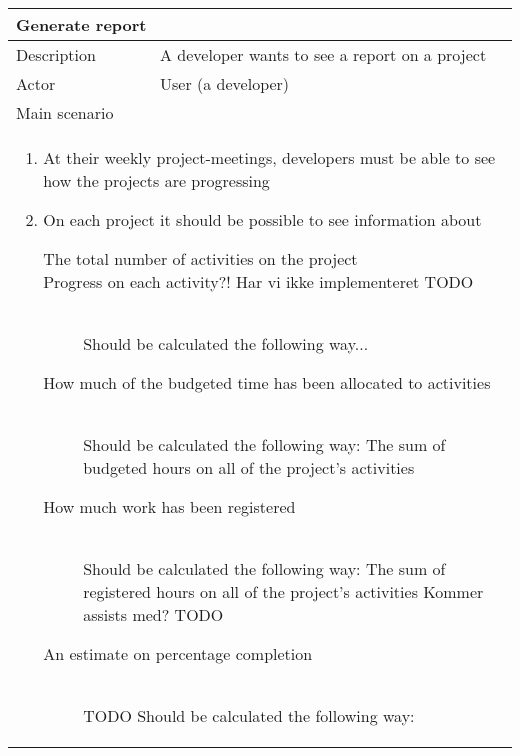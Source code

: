 \begin{table}[H]
  \begin{tabular}{|l|l|}
    \multicolumn{2}{l}{
      \bf{Generate report}
    }
    \\ \hline
    Description & A developer wants to see a report on a project
    \\ \hline
    Actor & User (a developer)
    \\ \hline \multicolumn{2}{|l|}{
      Main scenario 
    }
    \\ \hline \multicolumn{2}{|l|}{ \parbox{\textwidth}{
        \begin{enumerate}        
        \item{At their weekly project-meetings, developers must be able to see how the projects are progressing}
        \item{On each project it should be possible to see information about}
          \begin{description}
          \item[The total number of activities on the project] {}

          \item[Progress on each activity?! Har vi ikke implementeret TODO] \hfill \\
            {Should be calculated the following way...}

          \item[How much of the budgeted time has been allocated to activities]\hfill \\
            {Should be calculated the following way:
              The sum of budgeted hours on all of the project's activities}

          \item[How much work has been registered]\hfill \\
            {Should be calculated the following way:
              The sum of registered hours on all of the project's activities
              Kommer assists med? TODO}

          \item[An estimate on percentage completion]\hfill \\
            {TODO Should be calculated the following way:}


\end{description}
\end{enumerate}}}
\end{tabular}
\end{table}
